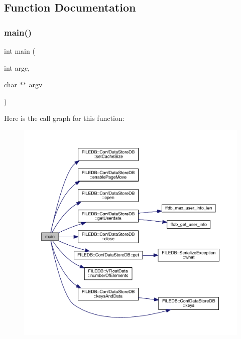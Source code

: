 \subsection{Function Documentation}
\mbox{\label{adat-devel_2other__libs_2filedb_2src_2SConfReadTest_8cpp_a3c04138a5bfe5d72780bb7e82a18e627}} 
\subsubsection{\texorpdfstring{main()}{main()}}
{\footnotesize\ttfamily int main (\begin{DoxyParamCaption}\item[{int}]{argc,  }\item[{char $\ast$$\ast$}]{argv }\end{DoxyParamCaption})}

Here is the call graph for this function\+:
\nopagebreak
\begin{figure}[H]
\begin{center}
\leavevmode
\includegraphics[width=350pt]{df/d61/adat-devel_2other__libs_2filedb_2src_2SConfReadTest_8cpp_a3c04138a5bfe5d72780bb7e82a18e627_cgraph}
\end{center}
\end{figure}
